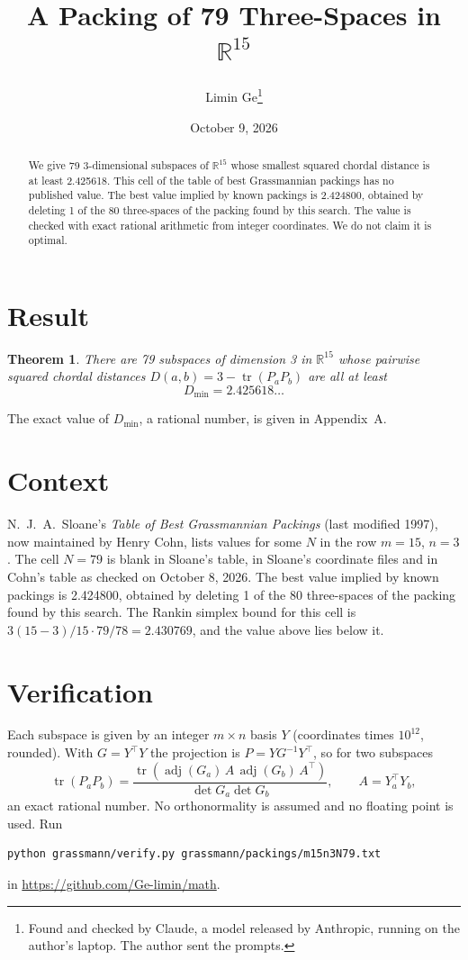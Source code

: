 \documentclass[11pt,a4paper]{article}
\title{A Packing of 79 Three-Spaces in $\mathbb{R}^{15}$}
\author{Limin Ge\thanks{Found and checked by Claude, a model released by Anthropic, running on the author's laptop. The author sent the prompts.}}
\date{October 9, 2026}
\newtheorem*{theorem}{Theorem}
\begin{document}
\maketitle
\begin{abstract}
We give 79 3-dimensional subspaces of $\mathbb{R}^{15}$ whose smallest squared chordal distance is at least 2.425618. This cell of the table of best Grassmannian packings has no published value. The best value implied by known packings is 2.424800, obtained by deleting 1 of the 80 three-spaces of the packing found by this search. The value is checked with exact rational arithmetic from integer coordinates. We do not claim it is optimal.
\end{abstract}

\section{Result}
\begin{theorem}
There are 79 subspaces of dimension 3 in $\mathbb{R}^{15}$ whose pairwise squared chordal distances $D(a,b) = 3 - \operatorname{tr}(P_aP_b)$ are all at least
\[ D_{\min} = 2.425618\ldots \]
\end{theorem}
The exact value of $D_{\min}$, a rational number, is given in Appendix~A.


\section{Context}
N.~J.~A.~Sloane's \emph{Table of Best Grassmannian Packings} (last modified 1997), now maintained by Henry Cohn, lists values for some $N$ in the row $m=15$, $n=3$. The cell $N=79$ is blank in Sloane's table, in Sloane's coordinate files and in Cohn's table as checked on October 8, 2026. The best value implied by known packings is 2.424800, obtained by deleting 1 of the 80 three-spaces of the packing found by this search. The Rankin simplex bound for this cell is $3(15-3)/15\cdot 79/78 = 2.430769$, and the value above lies below it.


\section{Verification}
Each subspace is given by an integer $m\times n$ basis $Y$ (coordinates times $10^{12}$, rounded). With $G=Y^\top Y$ the projection is $P=YG^{-1}Y^\top$, so for two subspaces
\[ \operatorname{tr}(P_aP_b)=\frac{\operatorname{tr}(\operatorname{adj}(G_a)\,A\,\operatorname{adj}(G_b)\,A^\top)}{\det G_a\det G_b},\qquad A=Y_a^\top Y_b, \]
an exact rational number. No orthonormality is assumed and no floating point is used. Run
\begin{verbatim}
python grassmann/verify.py grassmann/packings/m15n3N79.txt
\end{verbatim}
in \url{https://github.com/Ge-limin/math}.
\end{document}
